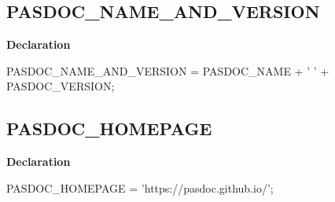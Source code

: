 \documentclass{report}
\newif\ifpdf
\begin{document}
\subsection*{PASDOC{\_}NAME{\_}AND{\_}VERSION}
\fi
\label{PasDoc_Versions-PASDOC_NAME_AND_VERSION}
\begin{list}{}{
\setlength{\itemindent}{0cm}
\setlength{\listparindent}{0cm}
\setlength{\leftmargin}{\evensidemargin}
\addtolength{\leftmargin}{\tmplength}
\settowidth{\labelsep}{X}
\addtolength{\leftmargin}{\labelsep}
\setlength{\labelwidth}{\tmplength}
}
\item[\textbf{Declaration}\hfill]
\ifpdf
\begin{flushleft}
\fi
\begin{ttfamily}
PASDOC{\_}NAME{\_}AND{\_}VERSION = PASDOC{\_}NAME + ' ' + PASDOC{\_}VERSION;\end{ttfamily}

\ifpdf
\end{flushleft}
\fi

\end{list}
\ifpdf
\subsection*{\large{\textbf{PASDOC{\_}HOMEPAGE}}\normalsize\hspace{1ex}\hrulefill}
\else
\subsection*{PASDOC{\_}HOMEPAGE}
\fi
\label{PasDoc_Versions-PASDOC_HOMEPAGE}
\begin{list}{}{
\setlength{\itemindent}{0cm}
\setlength{\listparindent}{0cm}
\setlength{\leftmargin}{\evensidemargin}
\addtolength{\leftmargin}{\tmplength}
\settowidth{\labelsep}{X}
\addtolength{\leftmargin}{\labelsep}
\setlength{\labelwidth}{\tmplength}
}
\item[\textbf{Declaration}\hfill]
\ifpdf
\begin{flushleft}
\fi
\begin{ttfamily}
PASDOC{\_}HOMEPAGE = 'https://pasdoc.github.io/';\end{ttfamily}

\ifpdf
\end{flushleft}
\fi

\end{list}
\end{document}
